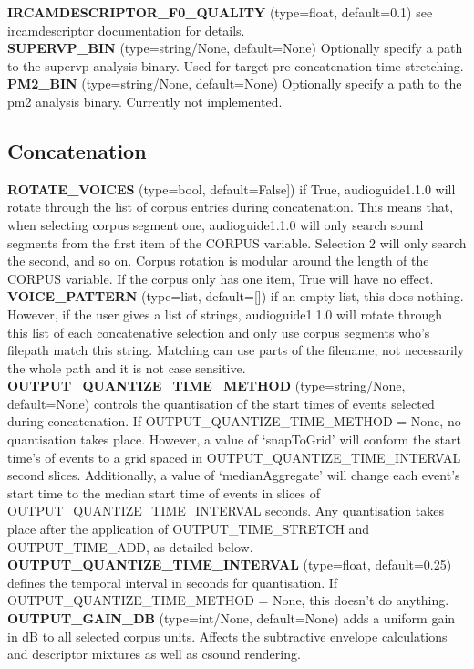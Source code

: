 \documentclass{article}
\newcommand{\optEntry}[4]{\textbf{#1} (type=#2, default=#3) #4\hspace{0.5em}\\}
\newcommand{\ag}{audioguide1.1.0\xspace}
\begin{document}
\begin{spacing}{1.2}
\optEntry{IRCAMDESCRIPTOR\_F0\_QUALITY}{float}{0.1}{see ircamdescriptor documentation for details.}

\optEntry{SUPERVP\_BIN}{string/None}{None}{Optionally specify a path to the supervp analysis binary.  Used for target pre-concatenation time stretching.}

\optEntry{PM2\_BIN}{string/None}{None}{Optionally specify a path to the pm2 analysis binary.  Currently not implemented.}


\subsection{Concatenation}
\optEntry{ROTATE\_VOICES}{bool}{False]}{if True, \ag will rotate through the list of corpus entries during concatenation.  This means that, when selecting corpus segment one, \ag will only search sound segments from the first item of the CORPUS variable.  Selection 2 will only search the second, and so on.  Corpus rotation is modular around the length of the CORPUS variable.  If the corpus only has one item, True will have no effect.}

\optEntry{VOICE\_PATTERN}{list}{[]}{if an empty list, this does nothing.  However, if the user gives a list of strings, \ag will rotate through this list of each concatenative selection and only use corpus segments who's filepath match this string.  Matching can use parts of the filename, not necessarily the whole path and it is not case sensitive.}

\optEntry{OUTPUT\_QUANTIZE\_TIME\_METHOD}{string/None}{None}{controls the quantisation of the start times of events selected during concatenation.  If OUTPUT\_QUANTIZE\_TIME\_METHOD = None, no quantisation takes place.  However, a value of `snapToGrid' will conform the start time's of events to a grid spaced in OUTPUT\_QUANTIZE\_TIME\_INTERVAL second slices.  Additionally, a value of `medianAggregate' will change each event's start time to the median start time of events in slices of OUTPUT\_QUANTIZE\_TIME\_INTERVAL seconds.  Any quantisation takes place after the application of OUTPUT\_TIME\_STRETCH and OUTPUT\_TIME\_ADD, as detailed below.}

\optEntry{OUTPUT\_QUANTIZE\_TIME\_INTERVAL}{float}{0.25}{defines the temporal interval in seconds for quantisation.  If OUTPUT\_QUANTIZE\_TIME\_METHOD = None, this doesn't do anything.}

\optEntry{OUTPUT\_GAIN\_DB}{int/None}{None}{adds a uniform gain in dB to all selected corpus units.  Affects the subtractive envelope calculations and descriptor mixtures as well as csound rendering.}


\end{spacing}
\end{document}
